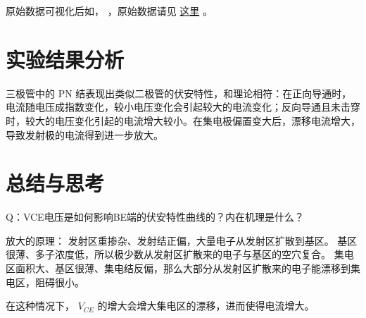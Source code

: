 \documentclass[lang=cn,11pt,a4paper,cite=authoryear]{elegantpaper}
\begin{document}
原始数据可视化后如， ，原始数据请见 \href{https://github.com/PannenetsF/Mirco-Electronic-Device-Experiment/tree/main/homework/hw07/01led}{这里} 。



\section{实验结果分析}

三极管中的 PN 结表现出类似二极管的伏安特性，和理论相符：在正向导通时，电流随电压成指数变化，较小电压变化会引起较大的电流变化；反向导通且未击穿时，较大的电压变化引起的电流增大较小。在集电极偏置变大后，漂移电流增大，导致发射极的电流得到进一步放大。

\section{总结与思考}

Q：VCE电压是如何影响BE端的伏安特性曲线的？内在机理是什么？

放大的原理：
发射区重掺杂、发射结正偏，大量电子从发射区扩散到基区。
基区很薄、多子浓度低，所以极少数从发射区扩散来的电子与基区的空穴复合。
集电区面积大、基区很薄、集电结反偏，那么大部分从发射区扩散来的电子能漂移到集电区，阻碍很小。

在这种情况下， \(V_{CE}\) 的增大会增大集电区的漂移，进而使得电流增大。

\end{document}
